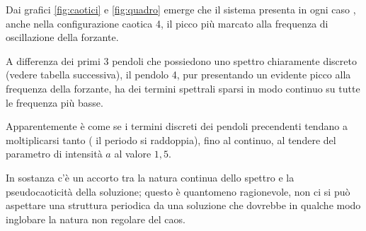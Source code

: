 \documentclass[13pt]{article}
\begin{document}
Dai grafici \ref{fig:caotici} e \ref{fig:quadro} emerge che il sistema presenta in ogni caso , anche nella configurazione caotica 4, il picco più marcato alla frequenza di oscillazione della forzante.

A differenza dei primi 3 pendoli che possiedono uno spettro chiaramente discreto (vedere tabella successiva), il pendolo 4, pur presentando un evidente picco alla frequenza della forzante, ha dei termini spettrali sparsi in modo continuo su tutte le frequenza più basse.

Apparentemente è come se i termini discreti dei pendoli precendenti tendano a moltiplicarsi tanto ( il periodo si raddoppia), fino al continuo, al tendere del parametro di intensità $a$ al valore $1,5$.

In sostanza c'è un accorto tra la natura continua dello spettro e la pseudocaoticità della soluzione; questo è quantomeno ragionevole, non ci si può aspettare una struttura periodica da una soluzione che dovrebbe in qualche modo inglobare la natura non regolare del caos.
\end{document}
